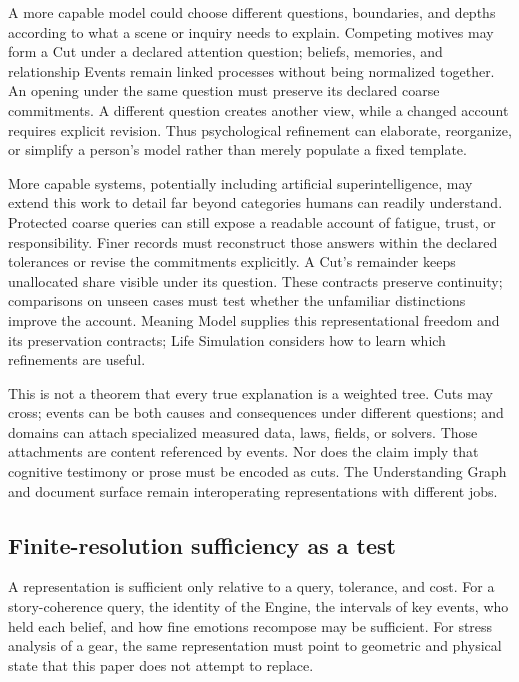\documentclass[11pt,a4paper]{article}
\begin{document}
A more capable model could choose different questions, boundaries, and depths
according to what a scene or inquiry needs to explain. Competing motives may
form a Cut under a declared attention question; beliefs, memories, and
relationship Events remain linked processes without being normalized together.
An opening under the same question must preserve its declared coarse
commitments. A different question creates another view, while a changed account
requires explicit revision. Thus psychological refinement can elaborate,
reorganize, or simplify a person's model rather than merely populate a fixed
template.

More capable systems, potentially including artificial superintelligence, may
extend this work to detail far beyond categories humans can readily understand.
Protected coarse queries can still expose a readable account of fatigue,
trust, or responsibility. Finer records must reconstruct those answers within
the declared tolerances or revise the commitments explicitly. A Cut's remainder
keeps unallocated share visible under its question. These contracts preserve
continuity; comparisons on unseen cases must test whether the unfamiliar
distinctions improve the account. Meaning Model supplies this representational freedom and its
preservation contracts; Life Simulation considers how to learn which
refinements are useful.

This is not a theorem that every true explanation is a weighted tree. Cuts may
cross; events can be both causes and consequences under different questions;
and domains can attach specialized measured data, laws, fields, or solvers.
Those attachments are content referenced by events. Nor does the claim imply that
cognitive testimony or prose must be encoded as cuts. The Understanding Graph
and document surface remain interoperating representations with different
jobs.

\subsection{Finite-resolution sufficiency as a test}
\label{sec:sufficiency}

A representation is sufficient only relative to a query, tolerance, and cost.
For a story-coherence query, the identity of the Engine, the intervals of key
events, who held each belief, and how fine emotions recompose may be sufficient.
For stress analysis of a gear, the same representation must point to geometric
and physical state that this paper does not attempt to replace.
\end{document}
